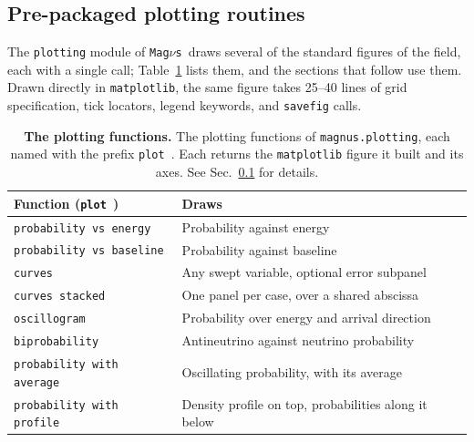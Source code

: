\documentclass[final,5p,times,twocolumn,sort,compress]{elsarticle}
\makeatletter
\DeclareRobustCommand{\_}{%
  \ifmmode\nfss@text{\textunderscore}\else\textunderscore\allowbreak\fi}
\newcommand{\Tab}{Table}
\newcommand{\tabl}[1]{\Tab~\ref{tab:#1}}
\newcommand{\magnus}{{\tt Mag}\ensuremath{\nu}{\tt s}}
\makeatother
\begin{document}

\subsection{Pre-packaged plotting routines}
\label{sec:plotting}

The {\tt plotting} module of \magnus\ draws several of the standard figures of the field, each with a single call; \tabl{plotting} lists them, and the sections that follow use them. Drawn directly in {\tt matplotlib}, the same figure takes 25--40 lines of grid specification, tick locators, legend keywords, and {\tt savefig} calls.

{\def\arraystretch{1.2}
\begin{table}[t!]
{\footnotesize
\begin{tabular}{@{}p{3.5cm}p{5.0cm}@{}}
 Function ({\tt plot\_}) & Draws \\
 \hline
 {\tt probability\_vs\_energy} & Probability against energy \\
 {\tt probability\_vs\_baseline} & Probability against baseline \\
 {\tt curves} & Any swept variable, optional error subpanel \\
 {\tt curves\_stacked} & One panel per case, over a shared abscissa \\
 {\tt oscillogram} & Probability over energy and arrival direction \\
 {\tt biprobability} & Antineutrino against neutrino probability \\
 {\tt probability\_with\_average} & Oscillating probability, with its average \\
 {\tt probability\_with\_profile} & Density profile on top, probabilities along it below \\
\end{tabular}}
\caption{\label{tab:plotting}\textbf{The plotting functions.} The plotting functions of {\tt magnus.plotting}, each named with the prefix {\tt plot\_}. Each returns the {\tt matplotlib} figure it built and its axes. See Sec.~\ref{sec:plotting} for details.}
\end{table}}
\end{document}
